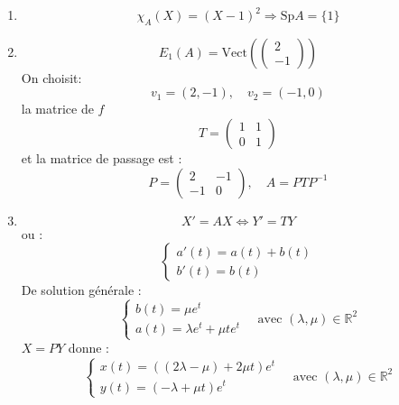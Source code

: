 \documentclass[a4paper,12pt,oneside]{book}
\newenvironment{solution}{\begin{solutionbox}}{\end{solutionbox}}
\begin{document}
\begin{solution}
	\begin{enumerate}
		\item \[
		\chi_A(X) = (X - 1)^2 \Rightarrow \text{Sp}A = \{1\}
		\]
		\item \[
		E_1(A) = \mathrm{Vect} \left( \begin{pmatrix} 2 \\ -1 \end{pmatrix} \right)
		\]
		On choisit:
		\[
		v_1 = (2, -1), \quad v_2 = (-1, 0)
		\]
		la matrice de \( f \) 
		\[
		T = \begin{pmatrix} 1 & 1 \\ 0 & 1 \end{pmatrix}
		\]
		et la matrice de passage est :
		\[
		P = \begin{pmatrix} 2 & -1 \\ -1 & 0 \end{pmatrix}, \quad A = P T P^{-1}
		\]
		
		\item \[
		X' = A X \iff Y' = T Y
		\]
		ou :
		\[
		\begin{cases}
			a'(t) = a(t) + b(t) \\
			b'(t) = b(t)
		\end{cases}
		\]
		De solution générale :
		\[
		\begin{cases}
			b(t) = \mu e^{t} \\
			a(t) = \lambda e^{t} + \mu t e^{t}
		\end{cases}
		\quad \text{avec } (\lambda, \mu) \in \mathbb{R}^2
		\]
		\( X = P Y \) donne :
		\[
		\begin{cases}
			x(t) = ((2\lambda - \mu) + 2\mu t)e^{t} \\
			y(t) = (-\lambda + \mu t)e^{t}
		\end{cases}
		\quad \text{avec } (\lambda, \mu) \in \mathbb{R}^2
		\]
	\end{enumerate}
\end{solution}


	
	
	\backmatter
	
\end{document}
